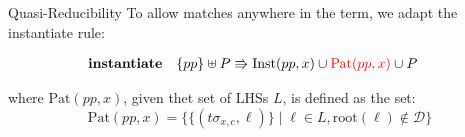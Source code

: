 \begin{frame}{Quasi-Reducibility}
To allow matches anywhere in the term, we adapt the instantiate rule:
\begin{footnotesize}
\begin{align*}
    \textbf{instantiate} & & \{pp\} \uplus P &\Rrightarrow \text{Inst}(pp, x) \cup \textcolor{red}{\text{Pat}(pp, x)} \cup P
\end{align*}

where $\text{Pat}(pp, x)$, given thet set of LHSs $L$, is defined as the set:
$$\text{Pat}(pp, x) = \{ \{(t\sigma_{x,c}, \ell)\} \mid \ell \in L, \text{root}(\ell) \not\in \mathcal{D}\}$$
\end{footnotesize}

\end{frame}

